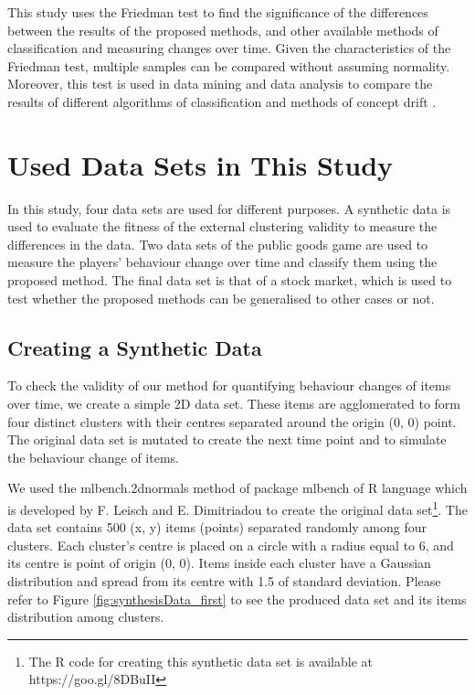 This study uses the Friedman test to find the significance of the differences between the results of the proposed methods, and other available methods of classification and measuring changes over time. Given the characteristics of the Friedman test, multiple samples can be compared without assuming normality. Moreover, this test is used in data mining and data analysis to compare the results of different algorithms of classification \cite{Demsar2006} and methods of concept drift \cite{Goncalves2014}.


\section{Used Data Sets in This Study}
\label{section:Used-Data}

In this study, four data sets are used for different purposes. A synthetic data is used to evaluate the fitness of the external clustering validity to measure the differences in the data. Two data sets of the public goods game are used to measure the players' behaviour change over time and classify them using the proposed method. The final data set is that of a stock market, which is used to test whether the proposed methods can be generalised to other cases or not.



\subsection{Creating a Synthetic Data}
\label{CreatingaSyntheticData}

To check the validity of our method for quantifying behaviour changes of items over time, we create a simple 2D data set. These items are agglomerated to form four distinct clusters with their centres separated around the origin (0, 0) point. The original data set is mutated to create the next time point and to simulate the behaviour change of items.

We used the mlbench.2dnormals method of package mlbench of R language which is developed by F. Leisch and E. Dimitriadou \cite{mlbench210} to create the original data set\footnote{The R code for creating this synthetic data set is available at https://goo.gl/8DBuII}. The data set contains 500 (x, y) items (points) separated randomly among four clusters. Each cluster's centre is placed on a circle with a radius equal to 6, and its centre is point of origin (0, 0). Items inside each cluster have a Gaussian distribution and spread from its centre with 1.5 of standard deviation. Please refer to Figure \ref{fig:synthesisData_first} to see the produced data set and its items distribution among clusters.

